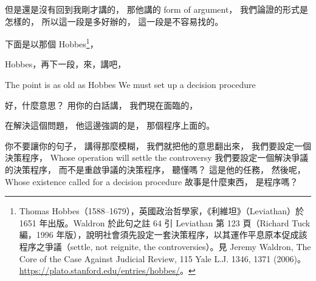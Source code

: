 \hypertarget{w06:cue:1928}{}但是還是沒有回到我剛才講的，
\hypertarget{w06:cue:1929}{}那他講的 form of argument，
\hypertarget{w06:cue:1930}{}我們論證的形式是怎樣的，
\hypertarget{w06:cue:1931}{}所以這一段是多好辦的，
\hypertarget{w06:cue:1932}{}這一段是不容易找的。

\hypertarget{w06:cue:1933}{}下面是以那個 Hobbes\footnote{Thomas Hobbes（1588–1679），英國政治哲學家，《利維坦》（Leviathan）於 1651 年出版。Waldron 於此句之註 64 引 Leviathan 第 123 頁（Richard Tuck 編，1996 年版），說明社會須先設定一套決策程序，以其運作平息原本促成該程序之爭議（settle, not reignite, the controversies）。見 Jeremy Waldron, The Core of the Case Against Judicial Review, 115 Yale L.J. 1346, 1371 (2006)。\url{https://plato.stanford.edu/entries/hobbes/}。}，

\hypertarget{w06:cue:1934}{}Hobbes，再下一段，來，講吧，

\hypertarget{w06:cue:1935}{}The point is as old as Hobbes
\hypertarget{w06:cue:1936}{}We must set up a decision procedure

\hypertarget{w06:cue:1937}{}好，什麼意思？
\hypertarget{w06:cue:1938}{}用你的白話講，
\hypertarget{w06:cue:1939}{}我們現在面臨的，

\hypertarget{w06:cue:1940}{}在解決這個問題，
\hypertarget{w06:cue:1941}{}他這邊強調的是，
\hypertarget{w06:cue:1942}{}那個程序上面的。

\hypertarget{w06:cue:1943}{}你不要讓你的句子，
\hypertarget{w06:cue:1944}{}講得那麼模糊，
\hypertarget{w06:cue:1945}{}我們就把他的意思翻出來，
\hypertarget{w06:cue:1946}{}我們要設定一個決策程序，
\hypertarget{w06:cue:1947}{}Whose operation will settle the controversy
\hypertarget{w06:cue:1948}{}我們要設定一個解決爭議的決策程序，
\hypertarget{w06:cue:1949}{}而不是重啟爭議的決策程序，
\hypertarget{w06:cue:1950}{}聽懂嗎？
\hypertarget{w06:cue:1951}{}這是他的任務，
\hypertarget{w06:cue:1952}{}然後呢，
\hypertarget{w06:cue:1953}{}Whose existence called for a decision procedure
\hypertarget{w06:cue:1954}{}故事是什麼東西，
\hypertarget{w06:cue:1955}{}是程序嗎？

